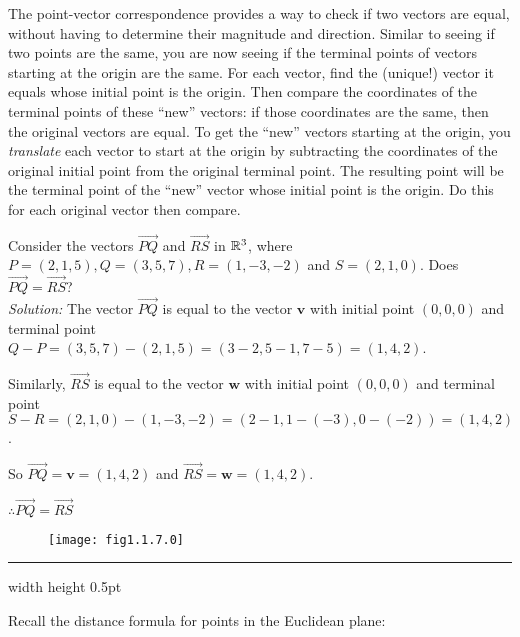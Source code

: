 The point-vector correspondence provides a way to check if two vectors are equal, without having to determine their magnitude and direction.  
Similar to seeing if two points are the same, you are now seeing if the terminal points of vectors starting at the origin are the same.  
For each vector, find the (unique!) vector it equals whose initial point is the origin.  
Then compare the coordinates of the terminal points of these ``new'' vectors: 
if those coordinates are the same, then the original vectors are equal.  
To get the ``new'' vectors starting at the origin, you \emph{translate}
each vector to start at the origin by subtracting the coordinates of the original
initial point from the original terminal point.  The resulting point will be the terminal point of
the ``new'' vector whose initial point is the origin.  Do this for each original vector then compare.

\begin{exmp}
 Consider the vectors $\overrightarrow{PQ}$ and $\overrightarrow{RS}$ in $\mathbb{R}^{3}$, where $P = (2,1,5),
 Q = (3,5,7), R = (1,-3,-2)$ and $S = (2,1,0)$.  Does $\overrightarrow{PQ} =
 \overrightarrow{RS}$?
 \\
 \emph{Solution:}
 The vector $\overrightarrow{PQ}$ is equal to the vector $\mathbf{v}$ with
 initial point $(0,0,0)$ and terminal point $Q - P = (3,5,7) - (2,1,5) = (3 - 2,5 - 1,7 - 5) = (1,4,2)$.
 \par\noindent
 Similarly, $\overrightarrow{RS}$ is equal to the vector $\mathbf{w}$ with
 initial point $(0,0,0)$ and terminal point $S - R = (2,1,0) - (1,-3,-2) = (2 - 1, 1 - (-3),0 - (-2)) = (1,4,2)$.
 \par\noindent
 So $\overrightarrow{PQ} = \mathbf{v} = (1,4,2)$ and $\overrightarrow{RS} = \mathbf{w} = (1,4,2)$.
 \par\noindent
 $\therefore \overrightarrow{PQ} = \overrightarrow{RS}$
\end{exmp}
\begin{figure}[h]
 \begin{center}
  \texttt{[image: fig1.1.7.0]}
 \end{center}
 \caption[]{}
 \label{fig:ex1.2}
\end{figure}
\hrule width \textwidth height 0.5pt
\medskip

Recall the distance formula for points in the Euclidean plane:

\medskip
{}
\medskip

